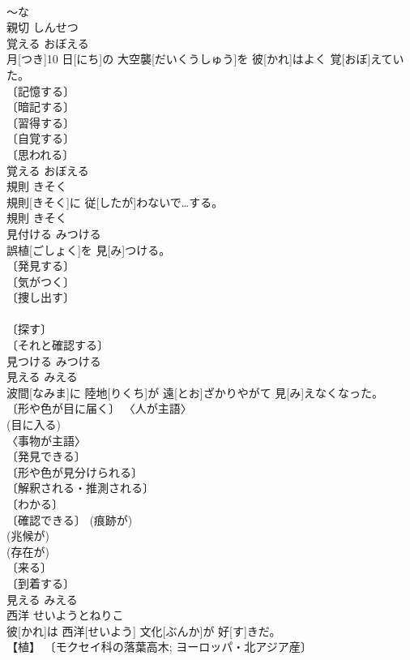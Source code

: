\documentclass[8pt]{extreport}
\begin{document}
\begin{CJK}{UTF8}{min}
\\	～な 
\\	親切	しんせつ	
\\	覚える	おぼえる	
\\	月[つき]10 日[にち]の 大空襲[だいくうしゅう]を 彼[かれ]はよく 覚[おぼ]えていた。	
\\	〔記憶する〕 
\\	〔暗記する〕 
\\	〔習得する〕 
\\	〔自覚する〕 
\\	〔思われる〕 
\\	覚える	おぼえる	
\\	規則	きそく	
\\	規則[きそく]に 従[したが]わないで…する。	
\\	規則	きそく	
\\	見付ける	みつける	
\\	誤植[ごしょく]を 見[み]つける。	
\\	〔発見する〕 
\\	〔気がつく〕 
\\	〔捜し出す〕 
\\	[⇒みつけだす] 
\\	〔探す〕 
\\	〔それと確認する〕 
\\	見つける	みつける	
\\	見える	みえる	
\\	波間[なみま]に 陸地[りくち]が 遠[とお]ざかりやがて 見[み]えなくなった。	
\\	〔形や色が目に届く〕 〈人が主語〉 
\\	(目に入る) 
\\	〈事物が主語〉 
\\	〔発見できる〕 
\\	〔形や色が見分けられる〕 
\\	〔解釈される・推測される〕 
\\	〔わかる〕 
\\	〔確認できる〕 (痕跡が) 
\\	(兆候が) 
\\	(存在が) 
\\	〔来る〕 
\\	〔到着する〕 
\\	見える	みえる	
\\	西洋	せいようとねりこ	
\\	彼[かれ]は 西洋[せいよう] 文化[ぶんか]が 好[す]きだ。	
\\	【植】 〔モクセイ科の落葉高木; ヨーロッパ・北アジア産〕 

\end{CJK}
\end{document}

